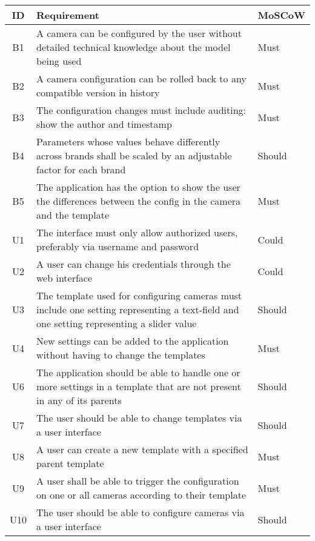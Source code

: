 \begin{table*}[h]
    \centering
    \begin{tabulary}{\linewidth}{CLL}
        \textbf{ID} & \textbf{Requirement} & \textbf{MoSCoW}
        \\ \hline %
        B1 & A camera can be configured by the user without detailed technical knowledge about the model being used & Must
        \\ \hline
        B2 & A camera configuration can be rolled back to any compatible version in history & Must
        \\ \hline
        B3 & The configuration changes must include auditing: show the author and timestamp & Must
        \\ \hline
        B4 & Parameters whose values behave differently across brands shall be scaled by an adjustable factor for each brand & Should
        \\ \hline
        B5 & The application has the option to show the user the differences between the config in the camera and the template & Must
        \\ \hline
        U1 & The interface must only allow authorized users, preferably via username and password & Could
        \\ \hline
        U2 & A user can change his credentials through the web interface & Could
        \\ \hline
        U3 & The template used for configuring cameras must include one setting representing a text-field and one setting representing a slider value & Should
        \\ \hline
        U4 & New settings can be added to the application without having to change the templates & Must
        \\ \hline
        U6 & The application should be able to handle one or more settings in a template that are not present in any of its parents & Should
        \\ \hline
        U7 & The user should be able to change templates via a user interface & Should
        \\ \hline
        U8 & A user can create a new template with a specified parent template & Must
        \\ \hline
        U9 & A user shall be able to trigger the configuration on one or all cameras according to their template & Must
		\\ \hline
		U10 & The user should be able to configure cameras via a user interface & Should

\end{tabulary}
\end{table*}
